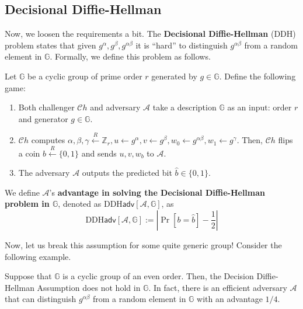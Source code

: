 \documentclass[../lecture-notes-148x210.tex]{subfiles}
\begin{document}
\subsection{Decisional Diffie-Hellman}

Now, we loosen the requirements a bit. The \textbf{Decisional Diffie-Hellman} (DDH) problem \cite[chapter 16]{Dan_Boneh_2023} 
states that given $g^{\alpha},g^{\beta},g^{\alpha\beta}$ it is ``hard'' to distinguish $g^{\alpha\beta}$ from a 
random element in $\mathbb{G}$. Formally, we define this problem as follows.

\begin{definition}
    Let $\mathbb{G}$ be a cyclic group of prime order $r$ generated by $g \in \mathbb{G}$. Define the following game:
    \begin{enumerate}
        \item Both challenger $\mathcal{C}h$ and adversary $\mathcal{A}$ take a description $\mathbb{G}$ as an input: order $r$ and generator $g \in \mathbb{G}$.
        \item $\mathcal{C}h$ computes $\alpha, \beta,\gamma \xleftarrow{R} \mathbb{Z}_r, u \gets g^{\alpha}, v \gets g^{\beta}, w_0 \gets g^{\alpha\beta}, w_1 \gets g^{\gamma}$. Then, $\mathcal{C}h$ flips a coin $b \xleftarrow{R} \{0,1\}$ and sends $u,v,w_b$ to $\mathcal{A}$.
        \item The adversary $\mathcal{A}$ outputs the predicted bit $\hat{b} \in \{0,1\}$.
    \end{enumerate}

    We define $\mathcal{A}$'s \textbf{advantage in solving the Decisional Diffie-Hellman problem in $\mathbb{G}$}, denoted as $\text{DDH}\mathsf{adv}[\mathcal{A},\mathbb{G}]$, as
    \begin{equation*}
        \text{DDH}\mathsf{adv}[\mathcal{A},\mathbb{G}] := \left| \Pr[b = \hat{b}] - \frac{1}{2} \right|
    \end{equation*}
\end{definition}

Now, let us break this assumption for some quite generic group! Consider the following example.

\begin{theorem}
    Suppose that $\mathbb{G}$ is a cyclic group of an even order. Then, the Decision
    Diffie-Hellman Assumption does not hold in $\mathbb{G}$. In fact, there is an efficient adversary $\mathcal{A}$ 
    that can distinguish $g^{\alpha\beta}$ from a random element in $\mathbb{G}$ with an advantage $1/4$.
\end{theorem}
\end{document}
